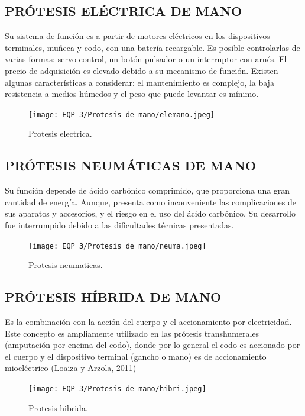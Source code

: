 \documentclass{article}
\begin{document}
\subsection{PRÓTESIS ELÉCTRICA DE MANO}
Su sistema de función es a partir de motores eléctricos en los dispositivos terminales, muñeca y codo, con una batería recargable. Es posible controlarlas de varias formas: servo control, un botón pulsador o un interruptor con arnés. El precio de adquisición es elevado debido a su mecanismo de función. Existen algunas características a considerar: el mantenimiento es complejo, la baja resistencia a medios húmedos y el peso que puede levantar es mínimo.
\begin{figure}[H] %
    \centering
    \texttt{[image: EQP 3/Protesis de mano/elemano.jpeg]}%
    \caption{Protesis electrica\cite{DiseCons}.}
    \label{grafica:dos}
\end{figure}


\subsection{PRÓTESIS NEUMÁTICAS DE MANO}
Su función depende de ácido carbónico comprimido, que proporciona una gran cantidad de energía. Aunque, presenta como inconveniente las complicaciones de sus aparatos y accesorios, y el riesgo en el uso del ácido carbónico. Su desarrollo fue interrumpido debido a las dificultades técnicas presentadas.
\begin{figure}[H] %
    \centering
    \texttt{[image: EQP 3/Protesis de mano/neuma.jpeg]}%
    \caption{Protesis neumaticas\cite{DiseCons}.}
    \label{grafica:dos}
\end{figure}





\subsection{PRÓTESIS HÍBRIDA DE MANO}
Es la combinación con la acción del cuerpo y el accionamiento por electricidad. Este concepto es ampliamente utilizado en las prótesis transhumerales (amputación por encima del codo), donde por lo general el codo es accionado por el cuerpo y el dispositivo terminal (gancho o mano) es de accionamiento mioeléctrico  (Loaiza y Arzola, 2011)
\begin{figure}[H] %
    \centering
    \texttt{[image: EQP 3/Protesis de mano/hibri.jpeg]}%
    \caption{Protesis hibrida\cite{AnSe}.}
    \label{grafica:dos}
\end{figure}
\end{document}
